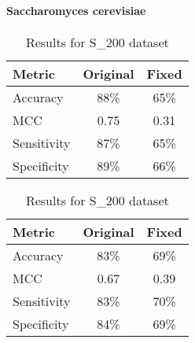       \paragraph{Saccharomyces cerevisiae}
        \noindent
        \begin{table}[H]
            \centering
            \begin{minipage}{0.45\textwidth}
              \centering
              \begin{tabular}{lcc}
                \toprule
                \textbf{Metric} & \textbf{Original} & \textbf{Fixed} \\
                \midrule
                Accuracy        & 88\%              & 65\%           \\
                MCC             & 0.75              & 0.31           \\
                Sensitivity     & 87\%              & 65\%           \\
                Specificity     & 89\%              & 66\%           \\
                \bottomrule
              \end{tabular}
              \caption{Results for S\_628 dataset}
            \end{minipage}%
            \hfill
            \begin{minipage}{0.45\textwidth}
              \centering
              \begin{tabular}{lcc}
                \toprule
                \textbf{Metric} & \textbf{Original} & \textbf{Fixed} \\
                \midrule
                Accuracy        & 83\%              & 69\%           \\
                MCC             & 0.67              & 0.39           \\
                Sensitivity     & 83\%              & 70\%           \\
                Specificity     & 84\%              & 69\%           \\
                \bottomrule
              \end{tabular}
              \caption{Results for S\_200 dataset}
            \end{minipage}\label{tab:pseu-st_pstnpss_sc}
        \end{table}

